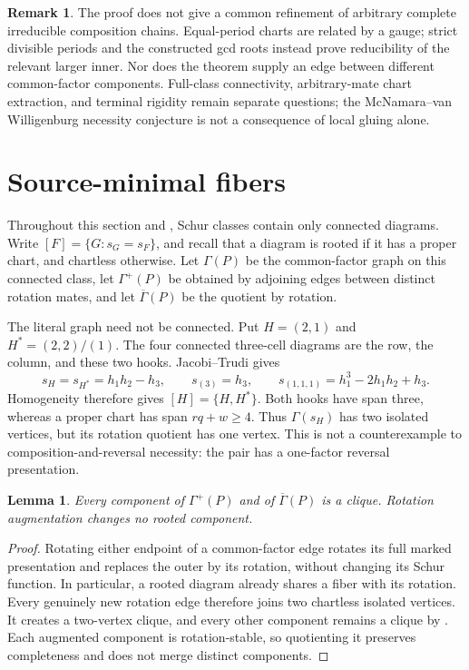 \documentclass[11pt,a4paper]{amsart}
\numberwithin{equation}{section}
\theoremstyle{plain}
\newtheorem{lemma}[theorem]{Lemma}
\theoremstyle{definition}
\newtheorem{remark}[theorem]{Remark}
\begin{document}
\begin{remark}
The proof does not give a common refinement of arbitrary complete irreducible composition chains.  Equal-period charts are related by a gauge; strict divisible periods and the constructed gcd roots instead prove reducibility of the relevant larger inner.  Nor does the theorem supply an edge between different common-factor components.  Full-class connectivity, arbitrary-mate chart extraction, and terminal rigidity remain separate questions; the McNamara--van Willigenburg necessity conjecture is not a consequence of local gluing alone.
\end{remark}

\section{Source-minimal fibers}\label{sec:minimal-fibers}

Throughout this section and , Schur classes contain only connected diagrams.  Write \([F]=\{G:s_G=s_F\}\), and recall that a diagram is rooted if it has a proper chart, and chartless otherwise.  Let \(\Gamma(P)\) be the common-factor graph on this connected class, let \(\Gamma^+(P)\) be obtained by adjoining edges between distinct rotation mates, and let \(\overline\Gamma(P)\) be the quotient by rotation.

The literal graph need not be connected.  Put \(H=(2,1)\) and \(H^*=(2,2)/(1)\).  The four connected three-cell diagrams are the row, the column, and these two hooks.  Jacobi--Trudi gives
\[
 s_H=s_{H^*}=h_1h_2-h_3,\qquad
 s_{(3)}=h_3,\qquad s_{(1,1,1)}=h_1^3-2h_1h_2+h_3.
\]
Homogeneity therefore gives \([H]=\{H,H^*\}\).  Both hooks have span three, whereas a proper chart has span \(rq+w\ge4\).  Thus \(\Gamma(s_H)\) has two isolated vertices, but its rotation quotient has one vertex.  This is not a counterexample to composition-and-reversal necessity: the pair has a one-factor reversal presentation.

\begin{lemma}\label{lem:rotation-components}
Every component of \(\Gamma^+(P)\) and of \(\overline\Gamma(P)\) is a clique.  Rotation augmentation changes no rooted component.
\end{lemma}
\begin{proof}
Rotating either endpoint of a common-factor edge rotates its full marked presentation and replaces the outer by its rotation, without changing its Schur function.  In particular, a rooted diagram already shares a fiber with its rotation.  Every genuinely new rotation edge therefore joins two chartless isolated vertices.  It creates a two-vertex clique, and every other component remains a clique by .  Each augmented component is rotation-stable, so quotienting it preserves completeness and does not merge distinct components.
\end{proof}
\end{document}
